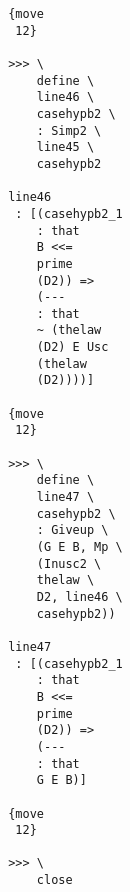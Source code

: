 \documentclass[12pt]{article}
\begin{document}
\begin{verbatim}
                                       {move 
                                        12}

                                       >>> \
                                           define \
                                           line46 \
                                           casehypb2 \
                                           : Simp2 \
                                           line45 \
                                           casehypb2

                                       line46 
                                        : [(casehypb2_1 
                                           : that 
                                           B <<= 
                                           prime 
                                           (D2)) => 
                                           (--- 
                                           : that 
                                           ~ (thelaw 
                                           (D2) E Usc 
                                           (thelaw 
                                           (D2))))]

                                       {move 
                                        12}

                                       >>> \
                                           define \
                                           line47 \
                                           casehypb2 \
                                           : Giveup \
                                           (G E B, Mp \
                                           (Inusc2 \
                                           thelaw \
                                           D2, line46 \
                                           casehypb2))

                                       line47 
                                        : [(casehypb2_1 
                                           : that 
                                           B <<= 
                                           prime 
                                           (D2)) => 
                                           (--- 
                                           : that 
                                           G E B)]

                                       {move 
                                        12}

                                       >>> \
                                           close


\end{verbatim}
\end{document}
